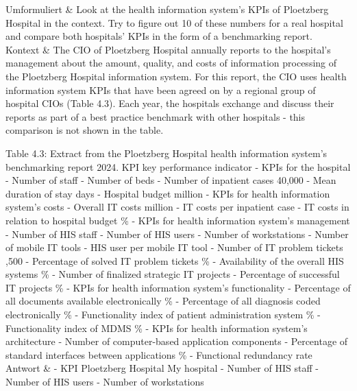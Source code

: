 Umformuliert & Look at the health information system's KPIs of Ploetzberg Hospital in the context. Try to figure out 10 of these numbers for a real hospital and compare both hospitals' KPIs in the form of a benchmarking report. \\
Kontext & The CIO of Ploetzberg Hospital annually reports to the hospital's management about the amount, quality, and costs of information processing of the Ploetzberg Hospital information system.
For this report, the CIO uses health information system KPIs that have been agreed on by a regional group of hospital CIOs (Table 4.3). Each year, the hospitals exchange and discuss their reports as part of a best practice benchmark with other hospitals - this comparison is not shown in the table.

Table 4.3: Extract from the Ploetzberg Hospital health information system's benchmarking report 2024.
KPI key performance indicator
- KPIs for the hospital
- Number of staff 
- Number of beds 
- Number of inpatient cases 40,000
- Mean duration of stay  days
- Hospital budget  million
- KPIs for health information system's costs
- Overall IT costs  million
- IT costs per inpatient case 
- IT costs in relation to hospital budget \%
- KPIs for health information system's management
- Number of HIS staff 
- Number of HIS users 
- Number of workstations 
- Number of mobile IT tools 
- HIS user per mobile IT tool 
- Number of IT problem tickets ,500
- Percentage of solved IT problem tickets \%
- Availability of the overall HIS systems \%
- Number of finalized strategic IT projects 
- Percentage of successful IT projects \%
- KPIs for health information system's functionality
- Percentage of all documents available electronically \%
- Percentage of all diagnosis coded electronically \%
- Functionality index of patient administration system \%
- Functionality index of MDMS \%
- KPIs for health information system's architecture
- Number of computer-based application components 
- Percentage of standard interfaces between applications \%
- Functional redundancy rate  \\
Antwort & - KPI \textbar Ploetzberg Hospital \textbar My hospital
- Number of HIS staff  
- Number of HIS users  
- Number of workstations  
